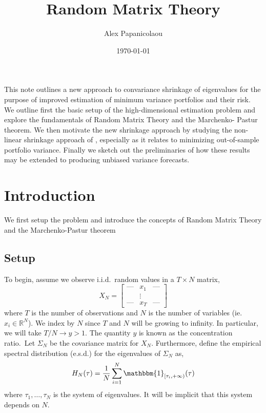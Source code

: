 \documentclass{article}
\begin{document}
\title{Random Matrix Theory}
\author{Alex Papanicolaou}
\date{\today}
\maketitle

\newcommand{\Tr}{\mathrm{Tr}}

This note outlines a new approach to convariance shrinkage of eigenvalues for
the purpose of improved estimation of minimum variance portfolios and their
risk.  We outline first the basic setup of the high-dimensional estimation
problem and explore the fundamentals of Random Matrix Theory and the Marchenko-
Pastur theorem.  We then motivate the new shrinkage approach by studying the
non-linear shrinkage approach of \cite{Ledoit2017Nonlinear}, especially as it
relates to minimizing out-of-sample portfolio variance.  Finally we sketch out
the preliminaries of how these results may be extended to producing unbiased
variance forecasts.

\section{Introduction}

We first setup the problem and introduce the concepts of Random Matrix Theory
and the Marchenko-Pastur theorem

\subsection{Setup}

To begin, assume we observe i.i.d.\ random values in a $T \times N$ matrix,
\begin{equation}\label{eq:X}
	X_N = \begin{bmatrix} 
					\text{---} & x_1    & \text{---} \\
					           & \vdots &            \\
					\text{---} & x_T    & \text{---}
				\end{bmatrix}
\end{equation}
where $T$ is the number of observations and $N$ is the number of variables (ie.
$x_i \in \mathbb{R}^N$).  We index by $N$ since $T$ and $N$ will be growing to
infinity.  In particular, we will take $T / N \rightarrow y > 1$.  The quantity
$y$ is known as the concentration ratio. Let $\Sigma_N$ be the covariance matrix
for $X_N$.  Furthermore, define the empirical spectral distribution (e.s.d.) for
the eigenvalues of $\Sigma_N$ as,
\begin{equation}\label{eq:H_N}
	H_N(\tau) = \frac{1}{N}\sum_{i=1}^N \mathbbm{1}_{[\tau_{i}, +\infty)}(\tau)
\end{equation}
where $\tau_{1}, \ldots, \tau_N$ is the system of eigenvalues.  It will be
implicit that this system depends on $N$. 
\end{document}
